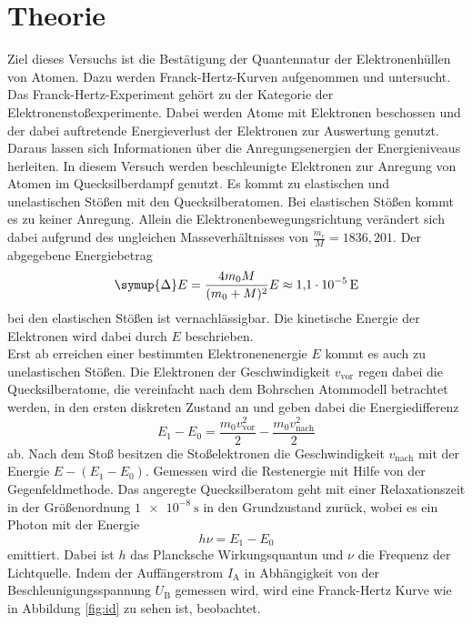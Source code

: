 \section{Theorie}
\label{sec:Theorie}
Ziel dieses Versuchs ist die Bestätigung der Quantennatur der Elektronenhüllen von Atomen.
Dazu werden Franck-Hertz-Kurven aufgenommen und untersucht.
\\
Das Franck-Hertz-Experiment gehört zu der Kategorie der Elektronenstoßexperimente. Dabei werden Atome mit Elektronen beschossen und der dabei auftretende Energieverlust der Elektronen zur Auswertung genutzt. Daraus lassen sich Informationen über die Anregungsenergien der Energieniveaus herleiten.
In diesem Versuch werden beschleunigte Elektronen zur Anregung von Atomen im Quecksilberdampf genutzt. Es kommt zu elastischen und unelastischen Stößen mit den Quecksilberatomen.
Bei elastischen Stößen kommt es zu keiner Anregung. Allein die Elektronenbewegungsrichtung verändert sich dabei aufgrund des ungleichen Masseverhältnisses von $\frac{m_e}{M}= 1836,201$.
Der abgegebene Energiebetrag 
\begin{equation}
    \symup{\Delta} E = \frac{4 m_0 M}{(m_0 + M)^2} E \approx \SI{1.1 e-5}{E}
\end{equation}
bei den elastischen Stößen ist vernachlässigbar. Die kinetische Energie der Elektronen wird dabei durch $E$ beschrieben.
\\
Erst ab erreichen einer bestimmten Elektronenenergie $E$ kommt es auch zu unelastischen Stößen. Die Elektronen der Geschwindigkeit $v_\text{vor}$ regen dabei die 
Quecksilberatome, die vereinfacht nach dem Bohrschen Atommodell betrachtet werden, in den ersten diskreten Zustand an und geben dabei die Energiedifferenz
\begin{equation}
    E_1-E_0 = \frac{m_0 v_\text{vor}^2}{2} - \frac{m_0 v_\text{nach}^2}{2}
\end{equation}
ab. Nach dem Stoß besitzen die Stoßelektronen die Geschwindigkeit $v_\text{nach}$ mit der Energie $E - (E_1 - E_0)$. Gemessen wird die Restenergie mit Hilfe von der Gegenfeldmethode.
Das angeregte Quecksilberatom geht mit einer Relaxationszeit in der Größenordnung $ \SI{1 e-8}{\second}$ in den Grundzustand zurück, wobei es ein Photon mit der Energie 
\begin{equation}
    h \nu = E_1 - E_0
\end{equation}
emittiert. Dabei ist $h$ das Plancksche Wirkungsquantun und $\nu$ die Frequenz der Lichtquelle.
Indem der Auffängerstrom $I_\text{A}$ in Abhängigkeit von der Beschleunigungsspannung $U_\text{B}$ gemessen wird, wird eine Franck-Hertz Kurve wie in Abbildung \ref{fig:id} zu sehen ist, beobachtet. 
